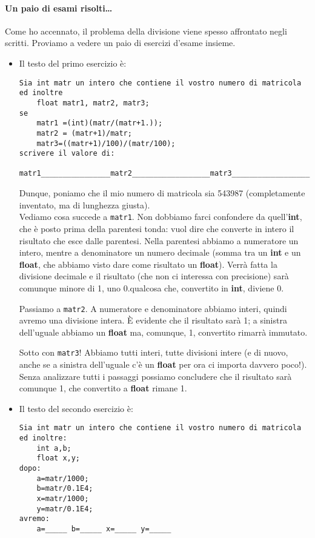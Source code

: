 	
	\paragraph{Un paio di esami risolti\ldots} Come ho accennato, il problema della divisione viene spesso affrontato negli scritti. Proviamo a vedere un paio di esercizi d'esame insieme.
\begin{itemize}


\item	Il testo del primo esercizio è:

\begin{shaded}
	\begin{verbatim}
Sia int matr un intero che contiene il vostro numero di matricola ed inoltre
    float matr1, matr2, matr3;
se
    matr1 =(int)(matr/(matr+1.));
    matr2 = (matr+1)/matr;
    matr3=((matr+1)/100)/(matr/100);
scrivere il valore di:
    matr1________________matr2__________________matr3__________________
	\end{verbatim}
\end{shaded}
	Dunque, poniamo che il mio numero di matricola sia 543987 (completamente inventato, ma di lunghezza giusta). \\
	Vediamo cosa succede a \verb|matr1|. Non dobbiamo farci confondere da quell'\textbf{int}, che è posto prima della parentesi tonda: vuol dire che converte in intero il risultato che esce dalle parentesi. Nella parentesi abbiamo a numeratore un intero, mentre a denominatore un numero decimale (somma tra un \textbf{int} e un \textbf{float}, che abbiamo visto dare come risultato un \textbf{float}). Verrà fatta la divisione decimale e il risultato (che non ci interessa con precisione) sarà comunque minore di 1, uno 0.qualcosa che, convertito in \textbf{int}, diviene 0.
	
	Passiamo a \verb|matr2|. A numeratore e denominatore abbiamo interi, quindi avremo una divisione intera. \`E evidente che il risultato sarà 1; a sinistra dell'uguale abbiamo un \textbf{float} ma, comunque, 1, convertito rimarrà immutato.
	
	Sotto con \verb|matr3|! Abbiamo tutti interi, tutte divisioni intere (e di nuovo, anche se a sinistra dell'uguale c'è un \textbf{float} per ora ci importa davvero poco!). Senza analizzare tutti i passaggi possiamo concludere che il risultato sarà comunque 1, che convertito a \textbf{float} rimane 1. 
	
\item Il testo del secondo esercizio è:
\begin{shaded}
	\begin{verbatim}
Sia int matr un intero che contiene il vostro numero di matricola 
ed inoltre:
    int a,b;
    float x,y;
dopo:
    a=matr/1000;
    b=matr/0.1E4;
    x=matr/1000;
    y=matr/0.1E4;
avremo:
    a=_____ b=_____ x=_____ y=_____
	\end{verbatim}
\end{shaded}


\end{itemize}
